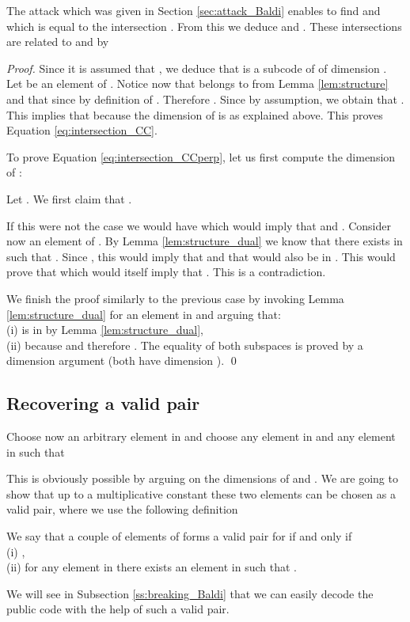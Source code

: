 \documentclass[runningheads,11pt]{llncs}
\begin{document}
The attack which was given in Section \ref{sec:attack_Baldi} enables to find  and  
which is equal to the intersection . From this we deduce 
 and . These intersections are related to
 and  by

\begin{lemma}
\label{lem:intersection}

\end{lemma}

\begin{proof}
Since it is assumed that , we deduce that
 is a subcode of 
of dimension . Let  be an element of . Notice now that 
 belongs to  from Lemma \ref{lem:structure} and
that   since  by definition of . Therefore .
Since  by assumption, we obtain that . 
This implies that  because the dimension of  is  as explained above.
This proves Equation \eqref{eq:intersection_CC}. 

To prove Equation  \eqref{eq:intersection_CCperp}, let us first compute the
dimension of :

Let  . We first claim that . 

If this were not the case we would have  which would imply that
 and . Consider now an element  of . By Lemma
\ref{lem:structure_dual} we know that there exists  in  such that
. Since , this would imply that  and 
that  would also be in . This would prove that  which would itself 
imply that . This is a contradiction.

We finish the proof similarly to the previous case by invoking Lemma \ref{lem:structure_dual} for an element
 in  and arguing that:\\
(i)  is in  by Lemma \ref{lem:structure_dual},\\
(ii)  because  and therefore .
The equality of both subspaces is proved by a dimension argument (both have dimension ).
\qed
\end{proof}

\subsection{Recovering a valid  pair}

Choose now an arbitrary element  in  and 
choose  any element  in  and any element
 in  such that

 This is obviously possible by arguing on the dimensions of  and
 .
 We are going to show that up to a multiplicative 
constant these two elements can be chosen as a valid  pair, where we use the following definition

\begin{definition}
We say that a couple  of elements of  forms a 
valid  pair for  if and only if \\
(i) ,\\
(ii) for any element  in  there
exists an element  in  such that .
\end{definition}
We will see in Subsection \ref{ss:breaking_Baldi} that we can easily decode  the public code  with the help of 
such a valid  pair.
\end{document}
